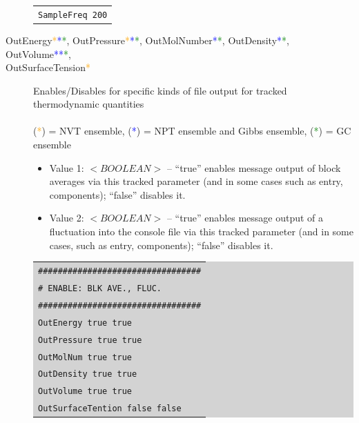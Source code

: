 \begin{description}
{\begin{tabular}{l}
	\texttt{SampleFreq 200}\\
	\end{tabular}}
\item [OutEnergy\textcolor{orange}{*}\textcolor{blue}{*}\textcolor{green}{*}, OutPressure\textcolor{orange}{*}\textcolor{blue}{*}\textcolor{green}{*}, OutMolNumber\textcolor{blue}{*}\textcolor{green}{*}, OutDensity\textcolor{blue}{*}\textcolor{green}{*}, OutVolume\textcolor{blue}{*}\textcolor{blue}{*}\textcolor{green}{*},\\ OutSurfaceTension\textcolor{orange}{*}] Enables/Disables for specific kinds of file output for tracked thermodynamic quantities\\\\
(\textcolor{orange}{*}) = NVT ensemble, (\textcolor{blue}{*}) = NPT ensemble and Gibbs ensemble, (\textcolor{green}{*}) = GC ensemble
	\begin{itemize}
	\item Value 1: $<BOOLEAN>$ – ``true'' enables message output of block averages via this tracked parameter (and in some cases such as entry, components); ``false'' disables it.
	\item Value 2: $<BOOLEAN>$ – ``true'' enables message output of a fluctuation into the console file via this tracked parameter (and in some cases, such as entry, components); ``false'' disables it.
	\end{itemize}
	\colorbox{lightgray}{
	\begin{tabular}{l}
	\texttt{\#\#\#\#\#\#\#\#\#\#\#\#\#\#\#\#\#\#\#\#\#\#\#\#\#\#\#\#\#\#\#\#\#}\\
	\texttt{\#  ENABLE: BLK AVE., FLUC.}\\
	\texttt{\#\#\#\#\#\#\#\#\#\#\#\#\#\#\#\#\#\#\#\#\#\#\#\#\#\#\#\#\#\#\#\#\#}\\
	\texttt{OutEnergy                      true    true}\\
	\texttt{OutPressure                   true    true}\\
	\texttt{OutMolNum                    true    true}\\
	\texttt{OutDensity                     true    true}\\
	\texttt{OutVolume                     true    true}\\
	\texttt{OutSurfaceTention         false   false}\\
	\end{tabular}}
\end{description}
\newpage
